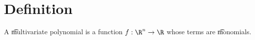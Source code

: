 
\section*{Definition}

A \t{multivariate polynomial} is a function $f: \R ^n \to \R $ whose terms are \t{monomials}.

\blankpage